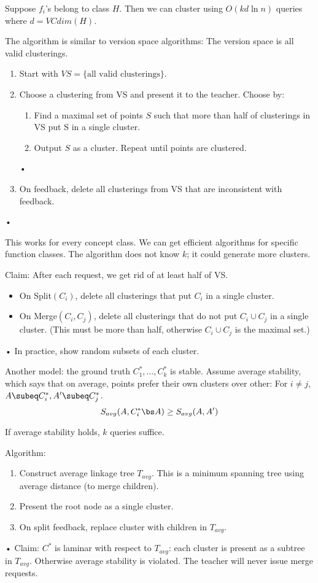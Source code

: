 \begin{thm}
Suppose $f_i$'s belong to class $H$. Then we can cluster using $O(kd\ln n)$ queries where $d=VCdim(H)$.
\end{thm}
The algorithm is similar to version space algorithms: The version space is all valid clusterings.
\begin{enumerate}
\item
 Start with $VS=\{\text{all valid clusterings}\}$. 
\item
Choose a clustering from VS and present it to the teacher.
Choose by:
\begin{enumerate}
\item
Find a maximal set of points $S$ such that more than half of clusterings in VS put S in a single cluster.
\item
Output $S$ as a cluster. Repeat until points are clustered.
\end{enumerate}•
\item
On feedback, delete all clusterings from VS that are inconsistent with feedback. 
\end{enumerate}•

This works for every concept class. We can get efficient algorithms for specific function classes.
%
The algorithm does not know $k$; it could generate more clusters.

Claim: After each request, we get rid of at least half of VS. 
\begin{itemize}
\item
On Split$(C_i)$, delete all clusterings that put $C_i$ in a single cluster. 
\item
On Merge$(C_i,C_j)$, delete all clusterings that do not put $C_i\cup C_j$ in a single cluster. (This must be more than half, otherwise $C_i\cup C_j$ is the maximal set.)
%
\end{itemize}•
In practice, show random subsets of each cluster.

Another model: the ground truth $C_1^*,\ldots, C_k^*$ is stable. Assume average stability, which says that on average, points prefer their own clusters over other: %
For $i\ne j$, $A\subeq C_i^*, A'\subeq C_j^*$.
$$
S_{avg}(A,C_i^*\bs A)\ge S_{avg}(A,A')
$$
\begin{thm}
If average stability holds, $k$ queries suffice.
\end{thm}
Algorithm:
\begin{enumerate}
\item
Construct average linkage tree $T_{avg}$. This is a minimum spanning tree using average distance (to merge children).
\item
Present the root node as a single cluster.
\item
On split feedback, replace cluster with children in $T_{avg}$.
\end{enumerate}•
Claim: $C^*$ is laminar with respect to $T_{avg}$: each cluster is present as a subtree in $T_{avg}$. Otherwise average stability is violated. The teacher will never issue merge requests.

